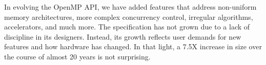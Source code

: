 In evolving the OpenMP API, we have added features that address 
non-uniform memory architectures, more complex concurrency control, 
irregular algorithms, accelerators, and much more. The specification 
has not grown due to a lack of discipline in its designers. Instead,
its growth reflects user demands for new features and how hardware 
has changed. In that light, a 7.5X increase in size over the course 
of almost 20 years is not surprising.


